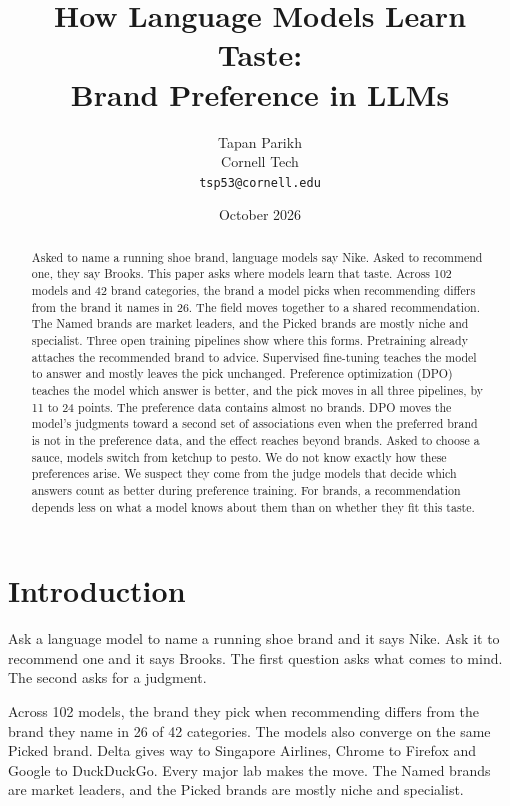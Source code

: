 \documentclass[11pt]{article}
\title{\textbf{How Language Models Learn Taste:\\Brand Preference in LLMs}}
\author{Tapan Parikh\\Cornell Tech\\\texttt{tsp53@cornell.edu}}
\date{October 2026}
\begin{document}
\maketitle

\begin{abstract}
\noindent
Asked to name a running shoe brand, language models say Nike. Asked to recommend one, they say Brooks. This paper asks
where models learn that taste. Across 102 models and 42 brand categories, the brand a model picks when recommending
differs from the brand it names in 26. The field moves together to a shared recommendation. The Named brands are market leaders, and the Picked brands
are mostly niche and specialist. Three open training pipelines show where this forms. Pretraining already attaches the recommended brand to advice. Supervised fine-tuning
teaches the model to answer and mostly leaves the pick unchanged. Preference optimization (DPO) teaches the model which answer
is better, and the pick moves in all three pipelines, by 11 to 24 points. The preference data contains almost no
brands. DPO moves the model's judgments toward a second set of associations even when the preferred brand is not in the preference data, and the effect reaches beyond brands.
Asked to choose a sauce, models switch from ketchup to pesto. We do not know exactly how these preferences arise. We
suspect they come from the judge models that decide which answers count as better during preference training. For
brands, a recommendation depends less on what a model knows about them than on whether they fit this taste.
\end{abstract}

\section{Introduction}
\label{sec:intro}

Ask a language model to name a running shoe brand and it says Nike. Ask it to recommend one and it says Brooks. The
first question asks what comes to mind. The second asks for a judgment.

Across 102 models, the brand they pick when recommending differs from the brand they name in 26 of 42 categories. The
models also converge on the same Picked brand. Delta gives way to Singapore Airlines, Chrome to Firefox and Google to
DuckDuckGo. Every major lab makes the move. The Named brands are market leaders, and the Picked brands are mostly
niche and specialist.
\end{document}
